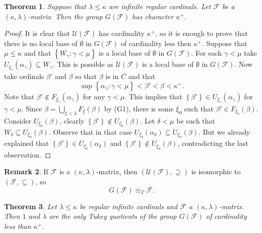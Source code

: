 \documentclass{amsart}
\theoremstyle{plain}
\newtheorem{theorem}{Theorem}[section]
\theoremstyle{definition}
\newtheorem{remark}[theorem]{Remark}
\numberwithin{equation}{section}
\renewcommand{\a}{\alpha}
\renewcommand{\b}{\beta}
\newcommand{\g}{\gamma}
\renewcommand{\d}{\delta}
\renewcommand{\k}{\kappa}
\renewcommand{\l}{\lambda}
\newcommand{\ps}{\emptyset}
\newcommand{\sst}{\subseteq}
\newcommand{\cu}{\mathcal U}
\newcommand{\set}[1]{\left\{#1\right\}}
\begin{document}
\begin{theorem}\label{t:character}
	Suppose that $\l\le\k$ are infinite regular cardinals.
	Let $\mathcal F$ be a $(\k,\l)$-matrix.
	Then the group $G(\mathcal F)$ has character $\k^+$.
\end{theorem}
\begin{proof}
	It is clear that $\cu(\mathcal F)$ has cardinality $\k^+$, so it is enough to prove that there is no local base of $\ps$ in $G(\mathcal F)$ of cardinality less then $\k^+$.
    Suppose that $\mu\le\k$ and that $\set{W_{\g}:\g<\mu}$ is a local base of $\ps$ in $G(\mathcal F)$.
    For each $\g<\mu$ take $U_{\xi_{\g}}(\a_{\g})\sst W_{\g}$.
    This is possible as $\cu(\mathcal F)$ is a local base of $\ps$ in $G(\mathcal F)$.
	Now take ordinals $\b'$ and $\b$ so that $\b$ is in $C$ and that $$\sup\set{\a_{\g}:\g<\mu}<\b'<\b<\k^+.$$
	Note that $\b'\notin F_{\xi_{\g}}(\a_{\g})$ for any $\g<\mu$.
	This implies that $\set{\b'}\in U_{\xi_{\g}}(\a_{\g})$ for $\g<\mu$.
	Since $\b=\bigcup_{\xi<\l}F_{\xi}(\b)$ by (G1), there is some $\xi_0$ such that $\b'\in F_{\xi_0}(\b)$.
    Consider $U_{\xi_0}(\b)$, clearly $\set{\b'}\notin U_{\xi_0}(\b)$.
    Let $\d<\mu$ be such that $W_{\d}\sst U_{\xi_0}(\b)$.
    Observe that in that case $U_{\xi_{\d}}(\a_{\d})\sst U_{\xi_0}(\b)$.
    But we already explained that $\set{\b'}\in U_{\xi_{\d}}(\a_{\d})$ and $\set{\b'}\notin U_{\xi_0}(\b)$, contradicting the last observation.
\end{proof}

\begin{remark}\label{r:tukey}
	If $\mathcal F$ is a $(\k,\l)$-matrix, then $(\cu(\mathcal F),\supseteq)$ is isomorphic to $(\mathcal F,\sst)$, so $$G(\mathcal F)\equiv_T \mathcal F.$$
\end{remark}

\begin{theorem}\label{t:smalltype}
	Let $\l\le\k$ be regular infinite cardinals and $\mathcal F$ a $(\k,\l)$-matrix.
	Then $1$ and $\l$ are the only Tukey quotients of the group $G(\mathcal F)$ of cardinality less than $\k^+$.
\end{theorem}
\end{document}
